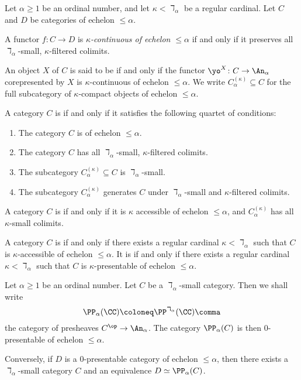 \begin{definition}
	Let $ \alpha \geq 1 $ be an ordinal number, and
	let $ \kappa < \daleth_{\alpha} $ be a regular cardinal.
	Let $ C $ and $ D $ be categories
	of echelon $ \leq \alpha $.

	A functor $ f \colon C \to D $
	is \emph{$ \kappa $-continuous of echelon  $ \leq \alpha $} if and only if 
	it preserves all $ \daleth_{\alpha} $-small, $ \kappa $-filtered colimits.
	
	An object $ X $ of $ C $
	is said to be  if and only if
	the functor $ \yo^X \colon C \to \An_{\alpha} $ corepresented by $ X $
	is $ \kappa $-continuous of echelon $ \leq \alpha $.
	We write $ C^{(\kappa)}_{\alpha} \subseteq C $
	for the full subcategory of $ \kappa $-compact objects of echelon $ \leq \alpha $.

	A category $C$ is
	 if and only if
	it satisfies the following quartet of conditions:
	\begin{enumerate}
		\item The category $ C $ is of echelon $ \leq \alpha $.
		\item The category $ C $ has all
			$ \daleth_{\alpha} $-small, $ \kappa $-filtered colimits.
		\item The subcategory $ C^{(\kappa)}_{\alpha} \subseteq C $
			is $ \daleth_{\alpha} $-small.
		\item The subcategory $ C^{(\kappa)}_{\alpha} $
			generates $ C $ under $ \daleth_{\alpha} $-small and 
			$ \kappa $-filtered colimits.
	\end{enumerate}
	
	A category $C$ is
	if and only if
	it is $ \kappa $ accessible of echelon $ \leq \alpha $, and  
	$ C^{(\kappa)}_{\alpha} $ has all $ \kappa $-small colimits.

	A category $ C $ is
	if and only if
	there exists a regular cardinal $ \kappa < \daleth_{\alpha} $
	such that $ C $ is $ \kappa $-accessible of echelon $ \leq \alpha $.
	It is
	if and only if
	there exists a regular cardinal $ \kappa < \daleth_{\alpha} $
	such that $ C $ is $ \kappa $-presentable of echelon $ \leq \alpha $.
\end{definition}

\begin{eg}
	Let $ \alpha \geq 1 $ be an ordinal number.
	Let $ C $ be a $ \daleth_{\alpha} $-small category.
	Then we shall write
	\[ \PP_{\alpha}(\CC) \coloneq \PP^{\daleth_{\alpha}}(\CC) \comma \]
	the category of presheaves $ C^{\op} \to \An_{\alpha} $.
	The category $ \PP_{\alpha}(C) $ is then
	$ 0 $-presentable of echelon $ \leq \alpha $.

	Conversely, if $ D $ is a $ 0 $-presentable category
	of echelon $ \leq \alpha $, then 
	there exists a $ \daleth_{\alpha} $-small category $ C $
	and an equivalence $ D \simeq \PP_{\alpha}(C) $.
\end{eg}

